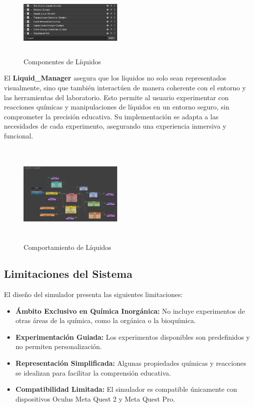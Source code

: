 \documentclass[conference]{IEEEtran}
\begin{document}
\begin{figure}[thbp]
    \centering
    \includegraphics[width=0.45\textwidth, height = 3.5cm]{img/Componentes_de_Liquidos.png}
    \caption{Componentes de Líquidos}
    \label{fig:Componentes de Líquidos}
\end{figure}

El \textbf{Liquid\_Manager} asegura que los líquidos no solo sean representados visualmente, sino que también interactúen de manera coherente con el entorno y las herramientas del laboratorio. Esto permite al usuario experimentar con reacciones químicas y manipulaciones de líquidos en un entorno seguro, sin comprometer la precisión educativa. Su implementación se adapta a las necesidades de cada experimento, asegurando una experiencia inmersiva y funcional.

\begin{figure}[thbp]
    \centering
    \includegraphics[width=0.45\textwidth, height = 5cm]{img/Liquids.png}
    \caption{Comportamiento de Líquidos}
    \label{fig:Comportamiento de Líquidos}
\end{figure}

\subsection{Limitaciones del Sistema}

El diseño del simulador presenta las siguientes limitaciones:
\begin{itemize}
    \item \textbf{Ámbito Exclusivo en Química Inorgánica:} No incluye experimentos de otras áreas de la química, como la orgánica o la bioquímica.
    \item \textbf{Experimentación Guiada:} Los experimentos disponibles son predefinidos y no permiten personalización.
    \item \textbf{Representación Simplificada:} Algunas propiedades químicas y reacciones se idealizan para facilitar la comprensión educativa.
    \item \textbf{Compatibilidad Limitada:} El simulador es compatible únicamente con dispositivos Oculus Meta Quest 2 y Meta Quest Pro.
\end{itemize}
\end{document}
